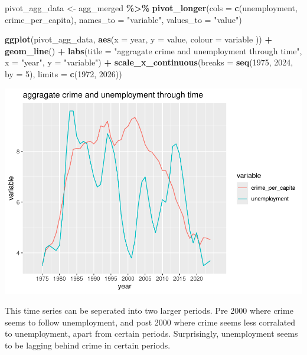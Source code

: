 \documentclass[
]{article}
\newenvironment{Shaded}{\begin{snugshade}}{\end{snugshade}}
\newcommand{\AttributeTok}[1]{\textcolor[rgb]{0.13,0.29,0.53}{#1}}
\newcommand{\DecValTok}[1]{\textcolor[rgb]{0.00,0.00,0.81}{#1}}
\newcommand{\FunctionTok}[1]{\textcolor[rgb]{0.13,0.29,0.53}{\textbf{#1}}}
\newcommand{\NormalTok}[1]{#1}
\newcommand{\OtherTok}[1]{\textcolor[rgb]{0.56,0.35,0.01}{#1}}
\newcommand{\SpecialCharTok}[1]{\textcolor[rgb]{0.81,0.36,0.00}{\textbf{#1}}}
\newcommand{\StringTok}[1]{\textcolor[rgb]{0.31,0.60,0.02}{#1}}
\begin{document}
\begin{Shaded}
\begin{Highlighting}[]
\NormalTok{pivot\_agg\_data }\OtherTok{\textless{}{-}}\NormalTok{ agg\_merged }\SpecialCharTok{\%\textgreater{}\%}
  \FunctionTok{pivot\_longer}\NormalTok{(}\AttributeTok{cols =} \FunctionTok{c}\NormalTok{(unemployment, crime\_per\_capita), }\AttributeTok{names\_to =} \StringTok{"variable"}\NormalTok{, }\AttributeTok{values\_to =} \StringTok{"value"}\NormalTok{)}

\FunctionTok{ggplot}\NormalTok{(pivot\_agg\_data, }\FunctionTok{aes}\NormalTok{(}\AttributeTok{x =}\NormalTok{ year, }\AttributeTok{y =}\NormalTok{ value, }\AttributeTok{colour =}\NormalTok{ variable )) }\SpecialCharTok{+}
  \FunctionTok{geom\_line}\NormalTok{() }\SpecialCharTok{+}
  \FunctionTok{labs}\NormalTok{(}\AttributeTok{title =} \StringTok{"aggragate crime and unemployment through time"}\NormalTok{, }\AttributeTok{x =} \StringTok{"year"}\NormalTok{, }\AttributeTok{y =} \StringTok{"variable"}\NormalTok{) }\SpecialCharTok{+}
  \FunctionTok{scale\_x\_continuous}\NormalTok{(}\AttributeTok{breaks =} \FunctionTok{seq}\NormalTok{(}\DecValTok{1975}\NormalTok{, }\DecValTok{2024}\NormalTok{, }\AttributeTok{by =} \DecValTok{5}\NormalTok{), }\AttributeTok{limits =} \FunctionTok{c}\NormalTok{(}\DecValTok{1972}\NormalTok{, }\DecValTok{2026}\NormalTok{))}
\end{Highlighting}
\end{Shaded}

\includegraphics[width=0.8\linewidth]{Template_Assignment_files/figure-latex/unnamed-chunk-4-1}

This time series can be seperated into two larger periods. Pre 2000
where crime seems to follow unemployment, and post 2000 where crime
seems less corralated to unemployment, apart from certain periods.
Surprisingly, unemployment seems to be lagging behind crime in certain
periods.
\end{document}

